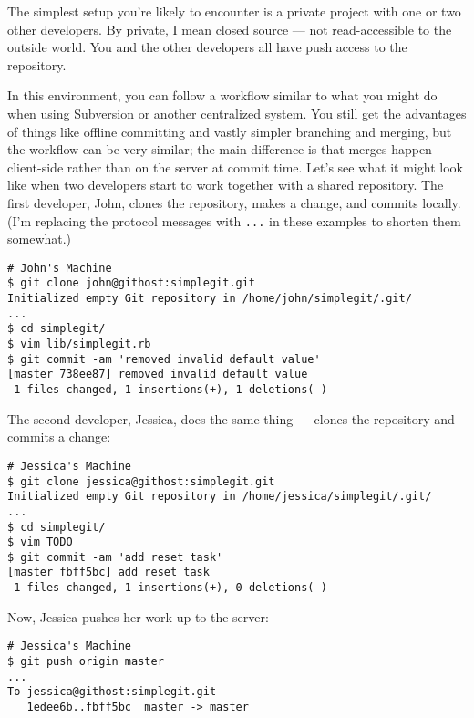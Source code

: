 \documentclass[a4paper]{book}
\begin{document}
The simplest setup you're likely to encounter is a private project with one or two other developers. By private, I mean closed source --- not read-accessible to the outside world. You and the other developers all have push access to the repository.

In this environment, you can follow a workflow similar to what you might do when using Subversion or another centralized system. You still get the advantages of things like offline committing and vastly simpler branching and merging, but the workflow can be very similar; the main difference is that merges happen client-side rather than on the server at commit time. Let's see what it might look like when two developers start to work together with a shared repository. The first developer, John, clones the repository, makes a change, and commits locally. (I'm replacing the protocol messages with \texttt{...} in these examples to shorten them somewhat.)

\begin{shaded}\begin{verbatim}
# John's Machine
$ git clone john@githost:simplegit.git
Initialized empty Git repository in /home/john/simplegit/.git/
...
$ cd simplegit/
$ vim lib/simplegit.rb
$ git commit -am 'removed invalid default value'
[master 738ee87] removed invalid default value
 1 files changed, 1 insertions(+), 1 deletions(-)
\end{verbatim}\end{shaded}

The second developer, Jessica, does the same thing --- clones the repository and commits a change:

\begin{shaded}\begin{verbatim}
# Jessica's Machine
$ git clone jessica@githost:simplegit.git
Initialized empty Git repository in /home/jessica/simplegit/.git/
...
$ cd simplegit/
$ vim TODO
$ git commit -am 'add reset task'
[master fbff5bc] add reset task
 1 files changed, 1 insertions(+), 0 deletions(-)
\end{verbatim}\end{shaded}

Now, Jessica pushes her work up to the server:

\begin{shaded}\begin{verbatim}
# Jessica's Machine
$ git push origin master
...
To jessica@githost:simplegit.git
   1edee6b..fbff5bc  master -> master
\end{verbatim}\end{shaded}
\end{document}
